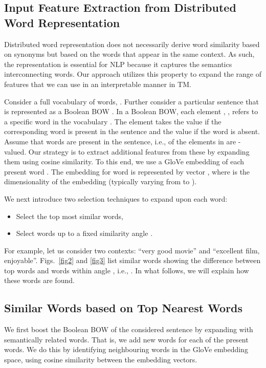 \documentclass[11pt]{article}
\begin{document}
\subsection{Input Feature Extraction from Distributed Word Representation}
Distributed word representation does not necessarily derive word similarity based on synonyms but based on the words that appear in the same context. As such, the representation is essential for NLP because it captures the semantics interconnecting words. Our approach utilizes this property to expand the range of features that we can use in an interpretable manner in TM.

\par Consider a full vocabulary  of  words, . Further consider a particular sentence that is represented as a Boolean BOW . In a Boolean BOW, each element , , refers to a specific word  in the vocabulary . The element  takes the value  if the corresponding word  is present in the sentence and the value  if the word is absent.  Assume that  words are present in the sentence, i.e.,  of the elements in  are -valued. Our strategy is to extract additional features from these by expanding them using cosine similarity. To this end, we use a GloVe embedding of each present word . The embedding for word  is represented by vector , where  is the dimensionality of the embedding (typically varying from  to ).

We next introduce two selection techniques to expand upon each word: 
\begin{itemize}
    \item Select the top  most similar words,
    \item Select words up to a fixed similarity angle .
\end{itemize}
\noindent For example, let us consider two contexts: ``very good movie'' and ``excellent film, enjoyable''.  Figs.~\ref{fig2} and \ref{fig3} list similar words showing the difference between top  words and words within angle , i.e., . In what follows, we will explain how these words are found. 

\subsection{Similar Words based on Top  Nearest Words}
We first boost the Boolean BOW of the considered sentence by expanding  with  semantically related words. That is, we add  new words for each of the  present words. We do this by identifying neighbouring words in the GloVe embedding space, using cosine similarity between the embedding vectors. 
\end{document}
